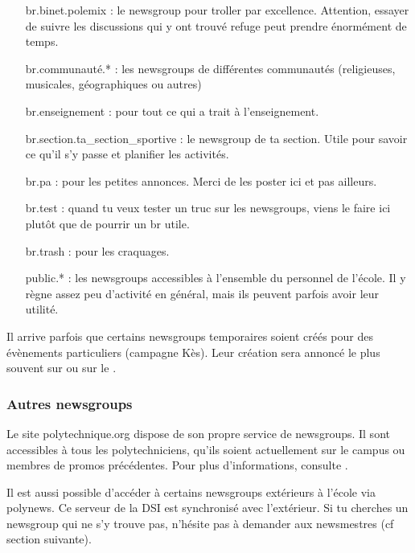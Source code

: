 \begin{itemize}
       que tu n'es pas le seul \`a loser. Pour la diff\'erence subtile entre une lose et une suba\"isse,
       contacter le binet suba\"isse (nous on a pas compris).
 \item[br.binet.polemix] : le newsgroup pour troller par excellence.
                           Attention, essayer de suivre les discussions qui y ont trouv\'e refuge
                           peut prendre \'enorm\'ement de temps.
 \item[br.communaut\'e.*] : les newsgroups de diff\'erentes communaut\'es
                            (religieuses, musicales, g\'eographiques ou autres)
 \item[br.enseignement] : pour tout ce qui a trait \`a l'enseignement.
 \item[br.section.ta\_section\_sportive] : le newsgroup de ta section.
                                           Utile pour savoir ce qu'il s'y passe et planifier les activit\'es.
 \item[br.pa] : pour les petites annonces. Merci de les poster ici et pas ailleurs.
 \item[br.test] : quand tu veux tester un truc sur les newsgroups,
                  viens le faire ici plut\^ot que de pourrir un br utile.
 \item[br.trash] : pour les craquages.
 \item[public.*] : les newsgroups accessibles \`a l'ensemble du personnel de l'\'ecole.
                   Il y r\`egne assez peu d'activit\'e en g\'en\'eral,
                   mais ils peuvent parfois avoir leur utilit\'e.
\end{itemize}

Il arrive parfois que certains newsgroups temporaires soient cr\'e\'es
pour des \'ev\`enements particuliers (campagne K\`es).
Leur cr\'eation sera annonc\'e le plus souvent sur \fkz ou sur le .

\subsubsection{Autres newsgroups}
Le site polytechnique.org dispose de son propre service de newsgroups.
Il sont accessibles \`a tous les polytechniciens, qu'ils soient actuellement sur le campus
ou membres de promos pr\'ec\'edentes.
Pour plus d'informations, consulte .

Il est aussi possible d'acc\'eder \`a certains newsgroups ext\'erieurs \`a l'\'ecole via polynews.
Ce serveur de la DSI est synchronis\'e avec l'ext\'erieur.
Si tu cherches un newsgroup qui ne s'y trouve pas, n'h\'esite pas \`a demander aux newsmestres
(cf section suivante).


